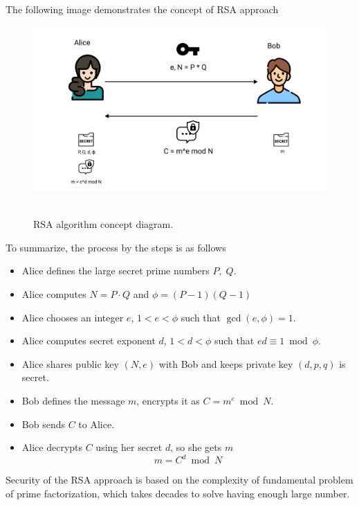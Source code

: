 \documentclass[12pt,letterpaper,oneside,reqno]{amsart}
\begin{document}
    The following image demonstrates the concept of RSA approach
    \begin{figure}[H]
        \centering
        \includegraphics[width=1\textwidth]{12_RSA_encryption_concept_diagram}
        ~\caption{RSA algorithm concept diagram.}\label{fig:figure8}
    \end{figure}
    To summarize, the process by the steps is as follows
    \begin{itemize}
        \item Alice defines the large secret prime numbers $P, \; Q$.
        \item Alice computes $N = P \cdot Q$ and $\phi = (P-1)(Q-1)$
        \item Alice chooses an integer $e$, $1<e< \phi$ such that $\gcd(e, \phi) = 1$.
        \item Alice computes secret exponent $d$, $1<d< \phi$ such that $ed \equiv 1 \bmod \phi$.
        \item Alice shares public key $(N,e)$ with Bob and keeps private key $(d, p, q)$ is secret.
        \item Bob defines the message $m$, encrypts it as $C = m^{e} \bmod N$.
        \item Bob sends $C$ to Alice.
        \item Alice decrypts $C$ using her secret $d$, so she gets $m$
        \[
            m = C^d \bmod N
        \]
    \end{itemize}
    Security of the RSA approach is based on the complexity of fundamental problem of prime factorization,
    which takes decades to solve having enough large number.

    
    
\end{document}
